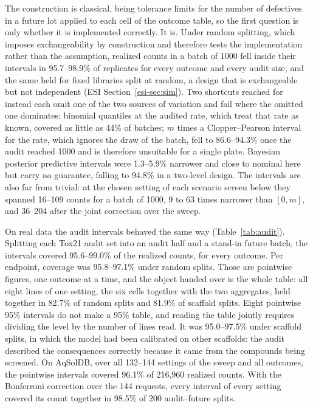 \documentclass[twocolumn,10pt]{article}
\begin{document}
The construction is classical, being tolerance limits for the number of defectives in a future lot applied to each cell of the outcome table, so the first question is only whether it is
implemented correctly. It is. Under random splitting, which imposes exchangeability by
construction and therefore tests the implementation rather than the assumption, realized counts
in a batch of 1000 fell inside their intervals in 95.7--98.9\% of replicates for every outcome
and every audit size, and the same held for fixed libraries split at random, a design that is
exchangeable but not independent (ESI Section~\ref{esi-sec:sim}). Two shortcuts reached for instead each omit one of the two sources of variation and fail where the omitted one
dominates: binomial quantiles at the audited rate, which treat that rate as known, covered as
little as 44\% of batches; $m$ times a Clopper--Pearson interval for the rate, which ignores
the draw of the batch, fell to 86.6--94.3\% once the audit reached 1000 and is therefore
unsuitable for a single plate. Bayesian posterior predictive intervals were 1.3--5.9\% narrower
and close to nominal here but carry no guarantee, falling to 94.8\% in a two-level design. The
intervals are also far from trivial: at the chosen setting of each scenario screen below they
spanned 16--109 counts for a batch of 1000, 9 to 63 times narrower than $[0,m]$, and 36--204
after the joint correction over the sweep.

On real data the audit intervals behaved the same way (Table~\ref{tab:audit}). Splitting each Tox21 audit set into an audit half and a stand-in future batch, the intervals covered 95.6--99.0\% of the realized counts, for every outcome. Per endpoint, coverage was 95.8--97.1\% under random splits. Those are pointwise figures, one outcome at a time, and the object handed over is the whole table: all eight lines of one setting, the six cells together with the two aggregates, held together in 82.7\% of random splits and 81.9\% of scaffold splits. Eight pointwise 95\% intervals do not make a 95\% table, and reading the table jointly requires dividing the level by the number of lines read. It was 95.0--97.5\% under scaffold splits, in which the model had been calibrated on other scaffolds: the audit described the consequences correctly because it came from the compounds being screened. On AqSolDB, over all 132--144 settings of the sweep and all outcomes, the pointwise intervals covered 96.1\% of 216,960 realized counts. With the Bonferroni correction over the 144 requests, every interval of every setting covered its count together in 98.5\% of 200 audit--future splits.
\end{document}
